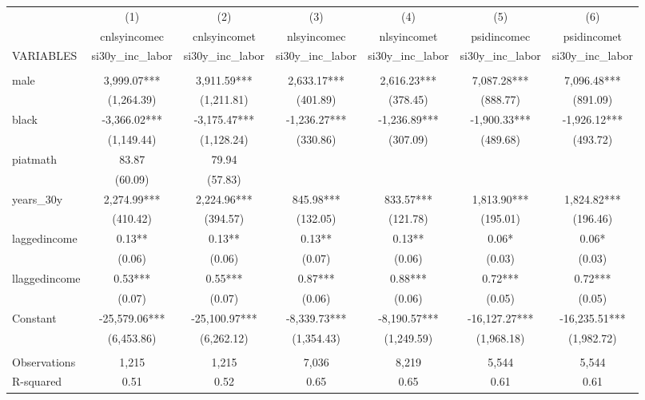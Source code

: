 \begin{tabular}{lcccccc} \hline
 & (1) & (2) & (3) & (4) & (5) & (6) \\
 & cnlsyincomec & cnlsyincomet & nlsyincomec & nlsyincomet & psidincomec & psidincomet \\
VARIABLES & si30y\_inc\_labor & si30y\_inc\_labor & si30y\_inc\_labor & si30y\_inc\_labor & si30y\_inc\_labor & si30y\_inc\_labor \\ \hline
 &  &  &  &  &  &  \\
male & 3,999.07*** & 3,911.59*** & 2,633.17*** & 2,616.23*** & 7,087.28*** & 7,096.48*** \\
 & (1,264.39) & (1,211.81) & (401.89) & (378.45) & (888.77) & (891.09) \\
black & -3,366.02*** & -3,175.47*** & -1,236.27*** & -1,236.89*** & -1,900.33*** & -1,926.12*** \\
 & (1,149.44) & (1,128.24) & (330.86) & (307.09) & (489.68) & (493.72) \\
piatmath & 83.87 & 79.94 &  &  &  &  \\
 & (60.09) & (57.83) &  &  &  &  \\
years\_30y & 2,274.99*** & 2,224.96*** & 845.98*** & 833.57*** & 1,813.90*** & 1,824.82*** \\
 & (410.42) & (394.57) & (132.05) & (121.78) & (195.01) & (196.46) \\
laggedincome & 0.13** & 0.13** & 0.13** & 0.13** & 0.06* & 0.06* \\
 & (0.06) & (0.06) & (0.07) & (0.06) & (0.03) & (0.03) \\
llaggedincome & 0.53*** & 0.55*** & 0.87*** & 0.88*** & 0.72*** & 0.72*** \\
 & (0.07) & (0.07) & (0.06) & (0.06) & (0.05) & (0.05) \\
Constant & -25,579.06*** & -25,100.97*** & -8,339.73*** & -8,190.57*** & -16,127.27*** & -16,235.51*** \\
 & (6,453.86) & (6,262.12) & (1,354.43) & (1,249.59) & (1,968.18) & (1,982.72) \\
 &  &  &  &  &  &  \\
Observations & 1,215 & 1,215 & 7,036 & 8,219 & 5,544 & 5,544 \\
 R-squared & 0.51 & 0.52 & 0.65 & 0.65 & 0.61 & 0.61 \\ \hline
\end{tabular}

